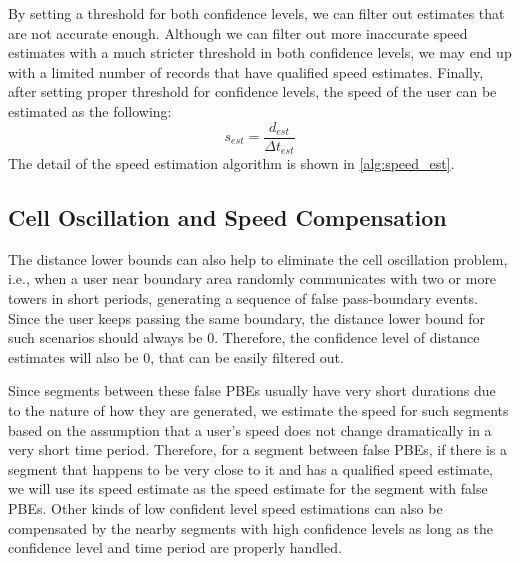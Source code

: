 By setting a threshold for both confidence levels, we can filter out estimates that are not accurate enough. Although we can filter out more inaccurate speed estimates with a much stricter threshold in both confidence levels, we may end up with a limited number of records that have qualified speed estimates. Finally, after setting proper threshold for confidence levels, the speed of the user can be estimated as the following:
\begin{equation}
  s_{est} = \frac{d_{est}}{\Delta t_{est}}
\end{equation}
The detail of the speed estimation algorithm is shown in \autoref{alg:speed_est}.

\subsection{Cell Oscillation and Speed Compensation}

The distance lower bounds can also help to eliminate the cell oscillation problem, i.e., when a user near boundary area randomly communicates with two or more towers in short periods, generating a sequence of false pass-boundary events. Since the user keeps passing the same boundary, the distance lower bound for such scenarios should always be $0$. Therefore, the confidence level of distance estimates will also be $0$, that can be easily filtered out.

Since segments between these false PBEs usually have very short durations due to the nature of how they are generated, we estimate the speed for such segments based on the assumption that a user's speed does not change dramatically in a very short time period. Therefore, for a segment between false PBEs, if there is a segment that happens to be very close to it and has a qualified speed estimate,  we will use its speed estimate as the speed estimate for the segment with false PBEs. Other kinds of low confident level speed estimations can also be compensated by the nearby segments with high confidence levels as long as the confidence level and time period are properly handled.

